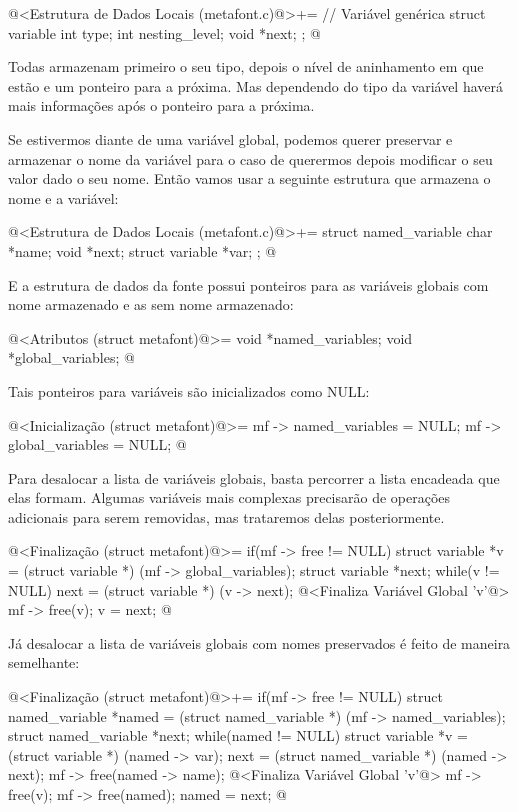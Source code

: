 \iniciocodigo
@<Estrutura de Dados Locais (metafont.c)@>+=
// Variável genérica
struct variable{
  int type;
  int nesting_level;
  void *next;
};
@
\fimcodigo

Todas armazenam primeiro o seu tipo, depois o nível de aninhamento em
que estão e um ponteiro para a próxima. Mas dependendo do tipo da
variável haverá mais informações após o ponteiro para a próxima.

Se estivermos diante de uma variável global, podemos querer preservar
e armazenar o nome da variável para o caso de querermos depois
modificar o seu valor dado o seu nome. Então vamos usar a seguinte
estrutura que armazena o nome e a variável:

\iniciocodigo
@<Estrutura de Dados Locais (metafont.c)@>+=
struct named_variable{
  char *name;
  void *next;
  struct variable *var;
};
@
\fimcodigo

E a estrutura de dados da fonte possui ponteiros para as variáveis
globais com nome armazenado e as sem nome armazenado:

\iniciocodigo
@<Atributos (struct metafont)@>=
  void *named_variables;
  void *global_variables;
@
\fimcodigo

Tais ponteiros para variáveis são inicializados como NULL:

\iniciocodigo
@<Inicialização (struct metafont)@>=
mf -> named_variables = NULL;
mf -> global_variables = NULL;
@
\fimcodigo

Para desalocar a lista de variáveis globais, basta percorrer a lista
encadeada que elas formam. Algumas variáveis mais complexas precisarão
de operações adicionais para serem removidas, mas trataremos delas
posteriormente.

\iniciocodigo
@<Finalização (struct metafont)@>=
if(mf -> free != NULL){
  struct variable *v = (struct variable *) (mf -> global_variables);
  struct variable *next;
  while(v != NULL){
    next = (struct variable *) (v -> next);
    @<Finaliza Variável Global 'v'@>
    mf -> free(v);
    v = next;
  }
}
@
\fimcodigo

Já desalocar a lista de variáveis globais com nomes preservados é
feito de maneira semelhante:

\iniciocodigo
@<Finalização (struct metafont)@>+=
if(mf -> free != NULL){
  struct named_variable *named = (struct named_variable *)
                                   (mf -> named_variables);
  struct named_variable *next;
  while(named != NULL){
    struct variable *v = (struct variable *) (named -> var);
    next = (struct named_variable *) (named -> next);
    mf -> free(named -> name);
    @<Finaliza Variável Global 'v'@>
    mf -> free(v);
    mf -> free(named);
    named = next;
  }
}
@
\fimcodigo

